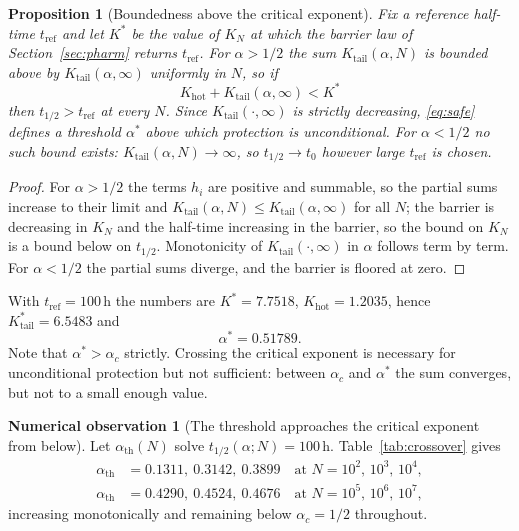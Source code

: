 \documentclass[11pt,reqno]{amsart}
\theoremstyle{plain}
\newtheorem{proposition}[theorem]{Proposition}
\theoremstyle{definition}
\newtheorem{observation}[theorem]{Numerical observation}
\theoremstyle{remark}
\numberwithin{equation}{section}
\newcommand{\Kt}{K_{\mathrm{tail}}}
\newcommand{\Khot}{K_{\mathrm{hot}}}
\newcommand{\ac}{\alpha_c}
\newcommand{\ath}{\alpha_{\mathrm{th}}}
\begin{document}
\begin{proposition}[Boundedness above the critical exponent]
\label{prop:crossover}
Fix a reference half-time $t_{\mathrm{ref}}$ and let $K^\ast$ be the value of $K_N$ at which the barrier law of Section~\ref{sec:pharm} returns $t_{\mathrm{ref}}$. For $\alpha>1/2$ the sum $\Kt(\alpha,N)$ is bounded above by $\Kt(\alpha,\infty)$ uniformly in $N$, so if
\begin{equation}
\label{eq:safe}
\Khot + \Kt(\alpha,\infty) < K^\ast
\end{equation}
then $t_{1/2}>t_{\mathrm{ref}}$ at \emph{every} $N$. Since $\Kt(\cdot,\infty)$ is strictly decreasing, \eqref{eq:safe} defines a threshold $\alpha^\ast$ above which protection is unconditional. For $\alpha<1/2$ no such bound exists: $\Kt(\alpha,N)\to\infty$, so $t_{1/2}\to t_0$ however large $t_{\mathrm{ref}}$ is chosen.
\end{proposition}

\begin{proof}
For $\alpha>1/2$ the terms $h_i$ are positive and summable, so the partial sums increase to their limit and $\Kt(\alpha,N)\le\Kt(\alpha,\infty)$ for all $N$; the barrier is decreasing in $K_N$ and the half-time increasing in the barrier, so the bound on $K_N$ is a bound below on $t_{1/2}$. Monotonicity of $\Kt(\cdot,\infty)$ in $\alpha$ follows term by term. For $\alpha<1/2$ the partial sums diverge, and the barrier is floored at zero.
\end{proof}

With $t_{\mathrm{ref}}=100$\,h the numbers are $K^\ast=7.7518$, $\Khot=1.2035$, hence $\Kt^\ast=6.5483$ and
\[
\alpha^\ast = 0.51789 .
\]
Note that $\alpha^\ast>\ac$ strictly. Crossing the critical exponent is necessary for unconditional protection but not sufficient: between $\ac$ and $\alpha^\ast$ the sum converges, but not to a small enough value.

\begin{observation}[The threshold approaches the critical exponent from below]
\label{obs:ath}
Let $\ath(N)$ solve $t_{1/2}(\alpha;N)=100$\,h. Table~\ref{tab:crossover} gives
\begin{align*}
\ath &= 0.1311,\ 0.3142,\ 0.3899 \quad\text{at } N = 10^2,\,10^3,\,10^4,\\
\ath &= 0.4290,\ 0.4524,\ 0.4676 \quad\text{at } N = 10^5,\,10^6,\,10^7,
\end{align*}
increasing monotonically and remaining below $\ac=1/2$ throughout.
\end{observation}
\end{document}
